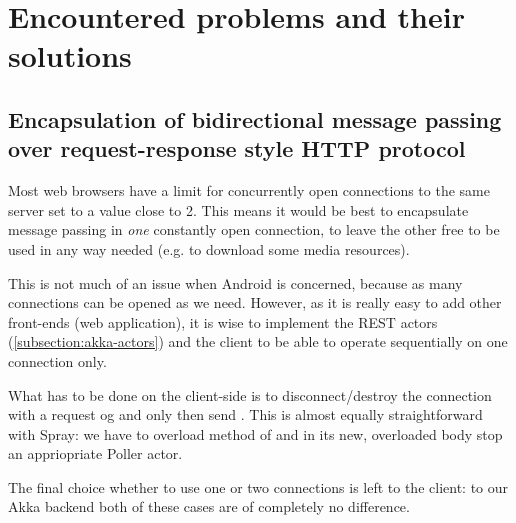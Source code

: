%
%
%
%
%

\section{Encountered problems and their solutions}
\label{sec:impl-problems}

\subsection{Encapsulation of bidirectional message passing over request-response style HTTP protocol}
\label{subsec:problem-longpolling}

Most web browsers have a limit for concurrently open connections to the same server set to a value close to 2. This means it would be best to encapsulate message passing in \emph{one} constantly open connection, to leave the other free to be used in any way needed (e.g. to download some media resources).

This is not much of an issue when Android is concerned, because as many connections can be opened as we need. However, as it is really easy to add other front-ends (web application), it is wise to implement the REST actors (\cref{subsection:akka-actors}) and the client to be able to operate sequentially on one connection only.

What has to be done on the client-side is to disconnect/destroy the connection with a request og  and only then send . This is almost equally straightforward with Spray: we have to overload  method of  and in its new, overloaded body stop an appriopriate Poller actor.

The final choice whether to use one or two connections is left to the client: to our Akka backend both of these cases are of completely no difference.

